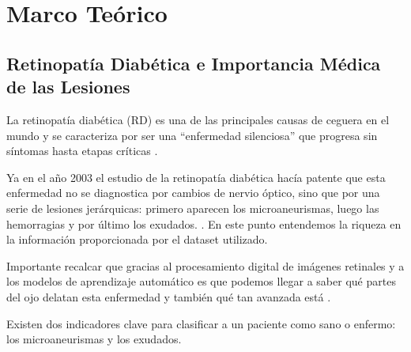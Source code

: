 \section{Marco Teórico}

\subsection{Retinopatía Diabética e Importancia Médica de las Lesiones}

La retinopatía diabética (RD) es una de las principales causas de ceguera en el mundo y se caracteriza por ser una ``enfermedad silenciosa'' que progresa sin síntomas hasta etapas críticas \parencite{casanova2014application}. 

Ya en el año 2003 el estudio de la retinopatía diabética hacía patente que esta enfermedad no se diagnostica por cambios de nervio óptico, sino que por una serie de lesiones jerárquicas: primero aparecen los microaneurismas, luego las hemorragias y por último los exudados. \parencite{wilkinson2003proposed}. En este punto entendemos la riqueza en la información proporcionada por el dataset utilizado. 

Importante recalcar que gracias al procesamiento digital de imágenes retinales y a los modelos de aprendizaje automático es que podemos llegar a saber qué partes del ojo delatan esta enfermedad y también qué tan avanzada está \parencite{abramoff2010retinal}.

Existen dos indicadores clave para clasificar a un paciente como sano o enfermo: los microaneurismas y los exudados.

